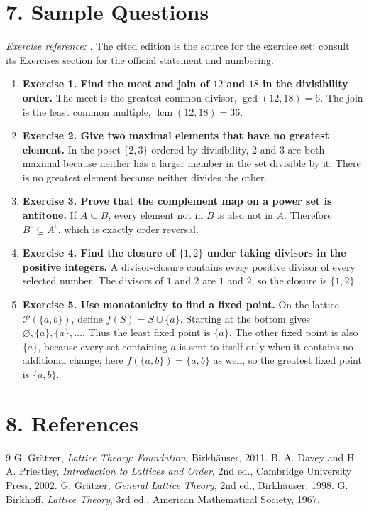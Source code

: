 \section*{7. Sample Questions}
\emph{Exercise reference:} \cite{order_theory_ref1}. The cited edition is the source for the exercise set; consult its Exercises section for the official statement and numbering.
\begin{enumerate}[leftmargin=*,itemsep=0.9em]
\item \textbf{Exercise 1. Find the meet and join of $12$ and $18$ in the divisibility order.} The meet is the greatest common divisor, $\gcd(12,18)=6$. The join is the least common multiple, $\operatorname{lcm}(12,18)=36$.

\item \textbf{Exercise 2. Give two maximal elements that have no greatest element.} In the poset $\{2,3\}$ ordered by divisibility, $2$ and $3$ are both maximal because neither has a larger member in the set divisible by it. There is no greatest element because neither divides the other.

\item \textbf{Exercise 3. Prove that the complement map on a power set is antitone.} If $A\subseteq B$, every element not in $B$ is also not in $A$. Therefore $B^c\subseteq A^c$, which is exactly order reversal.

\item \textbf{Exercise 4. Find the closure of $\{1,2\}$ under taking divisors in the positive integers.} A divisor-closure contains every positive divisor of every selected number. The divisors of $1$ and $2$ are $1$ and $2$, so the closure is $\{1,2\}$.

\item \textbf{Exercise 5. Use monotonicity to find a fixed point.} On the lattice $\mathcal P(\{a,b\})$, define $f(S)=S\cup\{a\}$. Starting at the bottom gives $\varnothing,\{a\},\{a\},\ldots$. Thus the least fixed point is $\{a\}$. The other fixed point is also $\{a\}$, because every set containing $a$ is sent to itself only when it contains no additional change; here $f(\{a,b\})=\{a,b\}$ as well, so the greatest fixed point is $\{a,b\}$.

\end{enumerate}
\section*{8. References}
\begin{thebibliography}{9}
 G. Grätzer, \emph{Lattice Theory: Foundation}, Birkhäuser, 2011.
 B. A. Davey and H. A. Priestley, \emph{Introduction to Lattices and Order}, 2nd ed., Cambridge University Press, 2002.
 G. Grätzer, \emph{General Lattice Theory}, 2nd ed., Birkhäuser, 1998.
 G. Birkhoff, \emph{Lattice Theory}, 3rd ed., American Mathematical Society, 1967.
\end{thebibliography}
